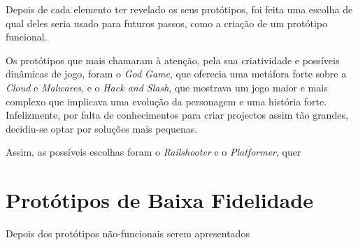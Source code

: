 Depois de cada elemento ter revelado os seus protótipos, foi feita uma escolha de qual deles seria usado para futuros passos, como a criação de um protótipo funcional.

Os protótipos que mais chamaram à atenção, pela sua criatividade e possíveis dinâmicas de jogo, foram o \textit{God Game}, que oferecia uma metáfora forte sobre a \textit{Cloud} e \textit{Malwares}, e o \textit{Hack and Slash}, que mostrava um jogo maior e mais complexo que implicava uma evolução da personagem e uma história forte. Infelizmente, por falta de conhecimentos para criar projectos assim tão grandes, decidiu-se optar por soluções mais pequenas.

Assim, as possíveis escolhas foram o \textit{Railshooter} e o \textit{Platformer}, quer

\section{Protótipos de Baixa Fidelidade}

Depois dos protótipos não-funcionais serem apresentados 